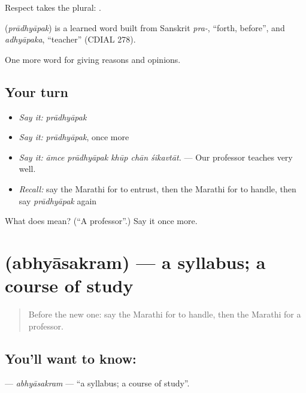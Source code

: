 Respect takes the plural:  .

\begin{cousinweb}
\textbf{} (\emph{prādhyāpak}) is a learned word built from Sanskrit \emph{pra-}, \textquotedblleft{}forth, before\textquotedblright{}, and \emph{adhyāpaka}, \textquotedblleft{}teacher\textquotedblright{} (CDIAL 278).
\end{cousinweb}

\begin{grammarlens}[title={What you've built}]
One more word for giving reasons and opinions.
\end{grammarlens}

\subsection*{Your turn}
\begin{itemize}
\raggedright
  \item \emph{Say it:} \emph{prādhyāpak}
  \item \emph{Say it:} \emph{prādhyāpak}, once more
  \item \emph{Say it:} \emph{āmce prādhyāpak khūp chān śikavtāt.} — Our professor teaches very well.
  \item \emph{Recall:} say the Marathi for to entrust, then the Marathi for to handle, then say \emph{prādhyāpak} again
\end{itemize}

\begin{tcolorbox}[breakable,colback=teal!4,colframe=teal!35!black,title={Before you move on}]
What does  mean? (\textquotedblleft{}A professor\textquotedblright{}.) Say it once more.
\end{tcolorbox}
\section[\texorpdfstring{\mr{अभ्यासक्रम} (abhyāsakram)}{अभ्यासक्रम (abhyāsakram)}]{ (abhyāsakram) — a syllabus; a course of study}

\label{lesson:MR-C369-abhyasakram}



\begin{quote}
Before the new one: say the Marathi for to handle, then the Marathi for a professor.
\end{quote}

\subsection*{You'll want to know: }
\textbf{} — \emph{abhyāsakram} — \textquotedblleft{}a syllabus; a course of study\textquotedblright{}.

